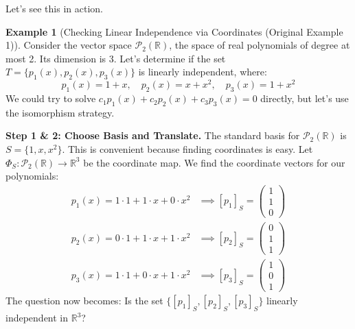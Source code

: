 \documentclass[11pt]{article}
\theoremstyle{definition}
\newtheorem{example}[theorem]{Example}
\theoremstyle{remark}
\newcommand{\R}{\mathbb{R}}
\newcommand{\Poly}[1]{\mathcal{P}_{#1}} %
\newcommand{\Rn}[1]{\R^{#1}}
\newcommand{\coord}[2]{[#1]_{#2}} %
\begin{document}
Let's see this in action.

\begin{example}[Checking Linear Independence via Coordinates (Original Example 1)]
    Consider the vector space $\Poly{2}(\R)$, the space of real polynomials of degree at most 2. Its dimension is 3. Let's determine if the set $T = \{p_1(x), p_2(x), p_3(x)\}$ is linearly independent, where:
    \[ p_1(x) = 1+x, \quad p_2(x) = x+x^2, \quad p_3(x) = 1+x^2 \]
    We could try to solve $c_1 p_1(x) + c_2 p_2(x) + c_3 p_3(x) = 0$ directly, but let's use the isomorphism strategy.

    \textbf{Step 1 \& 2: Choose Basis and Translate.}
    The standard basis for $\Poly{2}(\R)$ is $S = \{1, x, x^2\}$. This is convenient because finding coordinates is easy. Let $\Phi_S: \Poly{2}(\R) \to \Rn{3}$ be the coordinate map. We find the coordinate vectors for our polynomials:
    \begin{align*} %
        p_1(x) = 1 \cdot 1 + 1 \cdot x + 0 \cdot x^2 &\implies \coord{p_1}{S} = \begin{pmatrix} 1 \\ 1 \\ 0 \end{pmatrix} \\
        p_2(x) = 0 \cdot 1 + 1 \cdot x + 1 \cdot x^2 &\implies \coord{p_2}{S} = \begin{pmatrix} 0 \\ 1 \\ 1 \end{pmatrix} \\
        p_3(x) = 1 \cdot 1 + 0 \cdot x + 1 \cdot x^2 &\implies \coord{p_3}{S} = \begin{pmatrix} 1 \\ 0 \\ 1 \end{pmatrix}
    \end{align*}
    The question now becomes: Is the set $\{\coord{p_1}{S}, \coord{p_2}{S}, \coord{p_3}{S}\}$ linearly independent in $\Rn{3}$?


\end{example}
\end{document}
